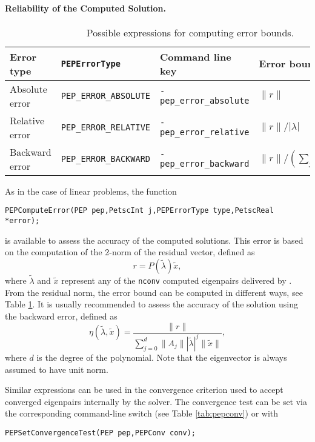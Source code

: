 \paragraph{Reliability of the Computed Solution.}

\begin{table}
\centering
{\small \begin{tabular}{llll}
Error type     & \texttt{PEPErrorType}         & Command line key          & Error bound \\\hline
Absolute error & \texttt{PEP\_ERROR\_ABSOLUTE} & \texttt{-pep\_error\_absolute} & $\|r\|$ \\
Relative error & \texttt{PEP\_ERROR\_RELATIVE} & \texttt{-pep\_error\_relative} & $\|r\|/|\lambda|$ \\
Backward error & \texttt{PEP\_ERROR\_BACKWARD} & \texttt{-pep\_error\_backward} & $\|r\|/(\sum_j\|A_j\||\lambda_i|^j)$ \\
\hline
\end{tabular} }
\caption{\label{tab:peperrors}Possible expressions for computing error bounds.}
\end{table}

As in the case of linear problems, the function
	\begin{Verbatim}[fontsize=\small]
	PEPComputeError(PEP pep,PetscInt j,PEPErrorType type,PetscReal *error);
	\end{Verbatim}
is available to assess the accuracy of the computed solutions. This error is based on the computation of the 2-norm of the residual vector, defined as
\begin{equation}
r=P(\tilde{\lambda})\tilde{x},\label{eq:respol}
\end{equation}
where $\tilde{\lambda}$ and $\tilde{x}$ represent any of the \texttt{nconv} computed eigenpairs delivered by .
From the residual norm, the error bound can be computed in different ways, see Table \ref{tab:peperrors}. It is usually recommended to assess the accuracy of the solution using the backward error, defined as
\begin{equation}
\eta(\tilde{\lambda},\tilde{x})=\frac{\|r\|}{\sum_{j=0}^d\|A_j\||\tilde\lambda|^j\|\tilde{x}\|},\label{eq:backward}
\end{equation}
where $d$ is the degree of the polynomial. Note that the eigenvector is always assumed to have unit norm.

Similar expressions can be used in the convergence criterion used to accept converged eigenpairs internally by the solver. The convergence test can be set via the corresponding command-line switch (see Table \ref{tab:pepconv}) or with
	\begin{Verbatim}[fontsize=\small]
	PEPSetConvergenceTest(PEP pep,PEPConv conv);
	\end{Verbatim}

